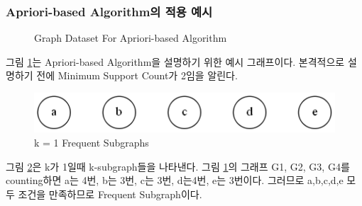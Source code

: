 \documentclass{oblivoir}
\begin{document}
		\subsubsection{Apriori-based Algorithm의 적용 예시}
		\begin{figure}[h]
			\centering
			\quad 
			\quad
			\quad 
			\caption{Graph Dataset For Apriori-based Algorithm}
			\label{apriori}
		\end{figure}
	
		그림 \ref{apriori}는 Apriori-based Algorithm을 설명하기 위한 예시 그래프이다. 본격적으로 설명하기 전에 Minimum Support Count가 2임을 알린다.
	\newpage
		\begin{figure}[h]
			\centering
			\includegraphics[width=.7\linewidth]{figure/apriori.5}
			\caption{k = 1 Frequent Subgraphs}
			\label{apriori_k_1}
		\end{figure}
	
		그림 \ref{apriori_k_1}은 k가 1일때 k-subgraph들을 나타낸다. 그림 \ref{apriori}의 그래프 G1, G2, G3, G4를 counting하면 a는 4번, b는 3번, c는 3번, d는4번, e는 3번이다. 그러므로 a,b,c,d,e 모두 조건을 만족하므로 Frequent Subgraph이다.
		
\end{document}
